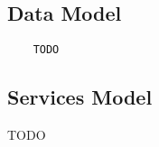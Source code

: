 	\subsection{Data Model} %
	\label{sub:data_model}
	\begin{verbatim}
	TODO
	\end{verbatim}


	\subsection{Services Model} %
	\label{sub:services_model}
	TODO

